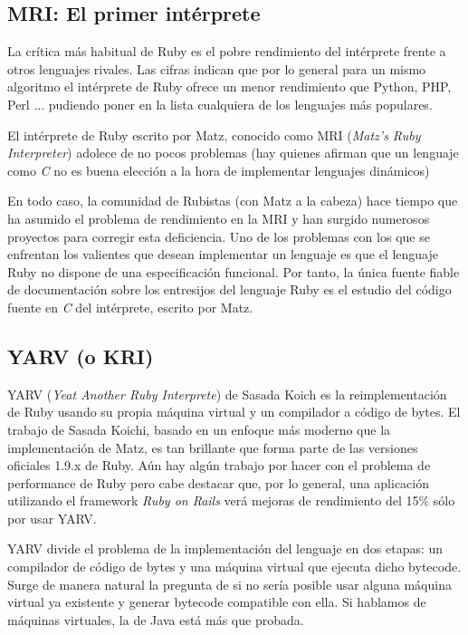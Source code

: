 \documentclass{article}
\begin{document}
\subsection{MRI: El primer intérprete}

	La crítica más habitual de Ruby es el pobre rendimiento del intérprete frente a otros lenguajes rivales. Las cifras indican que por lo general para un mismo algoritmo el intérprete de Ruby ofrece un menor rendimiento que Python, PHP, Perl ... pudiendo poner en la lista cualquiera de los lenguajes más populares.
	\par
	El intérprete de Ruby escrito por Matz, conocido como MRI (\textit{Matz's Ruby Interpreter}) adolece de no pocos problemas (hay quienes afirman que un lenguaje como \textit{C} no es buena elección a la hora de implementar lenguajes dinámicos)
	\par
	En todo caso, la comunidad de Rubistas (con Matz a la cabeza) hace tiempo que ha asumido el problema de rendimiento en la MRI y han surgido numerosos proyectos para corregir esta deficiencia. Uno de los problemas con los que se enfrentan los valientes que desean implementar un lenguaje es que el lenguaje Ruby no dispone de una especificación funcional. Por tanto, la única fuente fiable de documentación sobre los entresijos del lenguaje Ruby es el estudio del código fuente en \textit{C} del intérprete, escrito por Matz.
\bigskip



\subsection{YARV (o KRI)}

	YARV (\textit{Yeat Another Ruby Interprete}) de Sasada Koich es  la reimplementación de Ruby usando su propia máquina virtual y un compilador a código de bytes. El trabajo de Sasada Koichi, basado en un enfoque más moderno que la implementación de Matz, es tan brillante que forma parte de las versiones oficiales 1.9.x de Ruby. Aún hay algún trabajo por hacer con el problema de performance de Ruby pero cabe destacar que, por lo general, una aplicación utilizando el framework \textit{Ruby on Rails} verá mejoras de rendimiento del 15\% sólo por usar YARV.
	\par
	YARV divide el problema de la implementación del lenguaje en dos etapas: un compilador de código de bytes y una máquina virtual que ejecuta dicho bytecode. Surge de manera natural la pregunta de si no sería posible usar alguna máquina virtual ya existente y generar bytecode compatible con ella. Si hablamos de máquinas virtuales, la de Java está más que probada.
\bigskip
\end{document}
